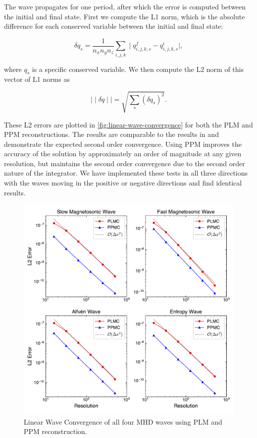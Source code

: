 \documentclass[modern, linenumbers]{aastex631}
\newcommand*{\img}[1]{%
    \raisebox{-.3\baselineskip}{%
        \texttt{[image: \#1]}%
    }%
}
\begin{document}
The wave propagates for one period, after which the error is computed between the initial and final state. First we compute the L1 norm, which is the absolute difference for each conserved variable between the initial and final state:

\begin{equation}
    \delta q_s = \frac{1}{n_x n_y n_z} \sum_{i,j,k} \mid q^f_{i,j,k,s} - q^i_{i,j,k,s} \mid,
\end{equation}

\noindent where $q_s$ is a specific conserved variable. We then compute the L2 norm of this vector of L1 norms as

\begin{equation}
    \mid \mid \delta q \mid \mid = \sqrt{\sum_s \left( \delta q_s \right)^2}.
\end{equation}

These L2 errors are plotted in \autoref{fig:linear-wave-convergence} for both the PLM and PPM reconstructions. The results are comparable to the results in \cite{stone_2009} and demonstrate the expected second order convergence. Using PPM improves the accuracy of the solution by approximately an order of magnitude at any given resolution, but maintains the second order convergence due to the second order nature of the integrator. We have implemented these tests in all three directions with the waves moving in the positive or negative directions and find identical results.

\begin{figure}[ht!]
    \includegraphics[width=\linewidth]{linear_convergence.pdf}
    \caption{Linear Wave Convergence of all four MHD waves using PLM and PPM reconstruction. \href{https://github.com/bcaddy/caddy-et-al-2023/blob/a5d284c28192e6ae8b0c09e82f75a36456cf0ca6/python/linear-wave-convergence.py}{\img{github.png}}}
    \label{fig:linear-wave-convergence}
\end{figure}
\end{document}

